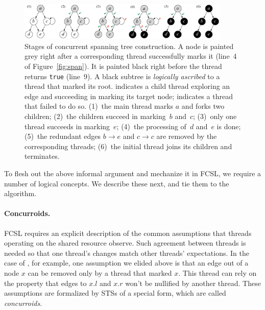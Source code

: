 {
\setlength{\belowcaptionskip}{-10pt} 
\begin{figure}[t!]
\centering
\includegraphics[width=0.9\textwidth]{stages.pdf}
\caption{Stages of concurrent spanning tree construction. A node is
  painted grey right after a corresponding thread successfully marks
  it (line~4 of Figure~\ref{fig:span}). It is painted black right
  before the thread returns \texttt{true} (line~9). A black subtree is
  \emph{logically ascribed} to a thread that marked its
  root. \textcolor{OliveGreen}{\cmark} indicates a child thread
  exploring an edge and succeeding in marking its target node;
  \textcolor{red}{\xmark} indicates a thread that failed to do
  so. (1)~the main thread marks $a$ and forks two children; (2)~the
  children succeed in marking~$b$ and~$c$; (3)~only one thread
  succeeds in marking~$e$; (4)~the processing of~$d$ and~$e$ is done;
  (5)~the redundant edges $b \rightarrow e$ and $c \rightarrow c$ are
  removed by the corresponding threads; (6)~the initial thread joins
  its children and terminates.}
\label{fig:stages}
\end{figure}
}

To flesh out the above informal argument and mechanize it in FCSL, we
require a number of logical concepts. We describe these next, and tie
them to the  algorithm.


\paragraph{Concurroids.~~}
\label{sec:conc-graph-prot}

FCSL requires an explicit description of the common assumptions that
threads operating on the shared resource observe. Such agreement
between threads is needed so that one thread's changes match other
threads' expectations. In the case of , for example, one
assumption we elided above is that an edge out of a node $x$ can be
removed only by a thread that marked $x$. This thread can rely on the
property that edges to $x.l$ and $x.r$ won't be nullified by another
thread. These assumptions are formalized by STSs of a special form,
which are called \emph{concurroids}.

